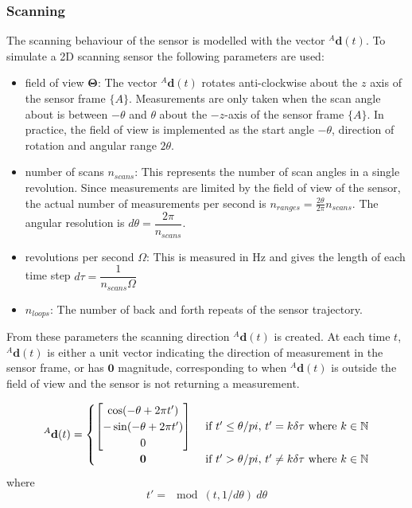 \subsubsection{Scanning}
The scanning behaviour of the sensor is modelled with the vector ${^{A}\mathbf{d}(t)}$.
To simulate a 2D scanning sensor the following parameters are used:
\begin{itemize}
\item field of view $\mathbf{\Theta}$: The vector ${^{A}\mathbf{d}(t)}$ rotates anti-clockwise about the $z$ axis of the sensor frame $\{A\}$. Measurements are only taken when the scan angle about is between $-\theta$ and $\theta$ about the $-z$-axis of the sensor frame $\{A\}$. In practice, the field of view is implemented as the start angle $-\theta$, direction of rotation and angular range $2\theta$.
\item number of scans $n_{scans}$: This represents the number of scan angles in a single revolution. Since measurements are limited by the field of view of the sensor, the actual number of measurements per second is $n_{ranges} = \frac{2\theta}{2\pi}n_{scans}$. The angular resolution is $d\theta = \dfrac{2\pi}{n_{scans}}$.
\item revolutions per second $\Omega$: This is measured in Hz and gives the length of each time step $d\tau = \dfrac{1}{n_{scans}\Omega}$
\item $n_{loops}$: The number of back and forth repeats of the sensor trajectory.
\end{itemize}
From these parameters the scanning direction ${^{A}\mathbf{d}(t)}$ is created. At each time $t$, ${^{A}\mathbf{d}(t)}$ is either a unit vector indicating the direction of measurement in the sensor frame, or has $\mathbf{0}$ magnitude, corresponding to when ${^{A}\mathbf{d}(t)}$ is outside the field of view and the sensor is not returning a measurement.

\begin{equation}
^{A}\mathbf{d}(t) =
	\begin{cases} 
	      \hfill \begin{bmatrix}
	      		\cos(-\theta + 2\pi t') \\
	      		-\sin(-\theta + 2\pi t') \\
	      		0
	      	\end{bmatrix}    \hfill & \text{ if $t' \leq \theta/pi$, $t' = k\delta\tau$ where $k \in \mathbb{N}$} \\
	      \hfill \mathbf{0} \hfill & \text{ if $t' > \theta/pi$, $t' \neq k\delta\tau$ where $k \in \mathbb{N}$} \\
	\end{cases} 
\end{equation}
where
\begin{equation}
t' = \mod(t,1/d\theta)\:d\theta
\end{equation}

